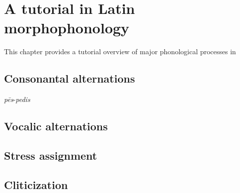 \chapter{A tutorial in Latin morphophonology}

This chapter provides a tutorial overview of major phonological processes in

\section{Consonantal alternations}

\emph{pēs}-\emph{pedis}

\section{Vocalic alternations}

\section{Stress assignment}

\section{Cliticization}
